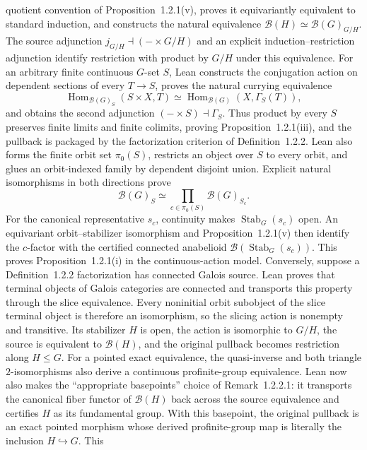 \begin{definition}
  quotient convention of Proposition~1.2.1(v), proves it equivariantly
  equivalent to standard induction, and constructs the natural equivalence
  $\mathcal B(H)\simeq\mathcal B(G)_{G/H}$.  The source adjunction
  $j_{G/H}\dashv(-\times G/H)$ and an explicit induction--restriction
  adjunction identify restriction with product by $G/H$ under this
  equivalence.  For an arbitrary finite continuous $G$-set $S$, Lean
  constructs the conjugation action on dependent sections of every
  $T\to S$, proves the natural currying equivalence
  \[
    \operatorname{Hom}_{\mathcal B(G)_S}(S\times X,T)
      \simeq
    \operatorname{Hom}_{\mathcal B(G)}(X,\Gamma_S(T)),
  \]
  and obtains the second adjunction
  $(-\times S)\dashv\Gamma_S$.  Thus product by every $S$ preserves finite
  limits and finite colimits, proving Proposition~1.2.1(iii), and the
  pullback is packaged by the factorization criterion of
  Definition~1.2.2.  Lean also forms the finite orbit set $\pi_0(S)$,
  restricts an object over $S$ to every orbit, and glues an orbit-indexed
  family by dependent disjoint union.  Explicit natural isomorphisms in both
  directions prove
  \[
    \mathcal B(G)_S \simeq
      \prod_{c\in\pi_0(S)}\mathcal B(G)_{S_c}.
  \]
  For the canonical representative $s_c$, continuity makes
  $\operatorname{Stab}_G(s_c)$ open.  An equivariant orbit--stabilizer
  isomorphism and Proposition~1.2.1(v) then identify the $c$-factor with the
  certified connected anabelioid
  $\mathcal B(\operatorname{Stab}_G(s_c))$.  This proves
  Proposition~1.2.1(i) in the continuous-action model.  Conversely, suppose a
  Definition~1.2.2 factorization has connected Galois source.  Lean proves that
  terminal objects of Galois categories are connected and transports this
  property through the slice equivalence.  Every noninitial orbit subobject of
  the slice terminal object is therefore an isomorphism, so the slicing action
  is nonempty and transitive.  Its stabilizer $H$ is open, the action is
  isomorphic to $G/H$, the source is equivalent to $\mathcal B(H)$, and the
  original pullback becomes restriction along $H\leq G$.  For a pointed exact
  equivalence, the quasi-inverse and both triangle $2$-isomorphisms also derive
  a continuous profinite-group equivalence.  Lean now also makes the
  ``appropriate basepoints'' choice of Remark~1.2.2.1: it transports the
  canonical fiber functor of $\mathcal B(H)$ back across the source
  equivalence and certifies $H$ as its fundamental group.  With this basepoint,
  the original pullback is an exact pointed morphism whose derived
  profinite-group map is literally the inclusion $H\hookrightarrow G$.  This

\end{definition}
